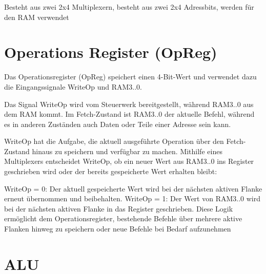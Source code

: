 Besteht aus zwei 2x4 Multiplexern, besteht aus zwei 2x4 Adressbits, werden für den RAM verwendet

\section{Operations Register (OpReg)}
\label{sec: operations-register}

Das Operationsregister (OpReg) speichert einen 4-Bit-Wert und verwendet dazu die Eingangssignale WriteOp und RAM3..0.

Das Signal WriteOp wird vom Steuerwerk bereitgestellt, während RAM3..0 aus dem RAM kommt. Im Fetch-Zustand ist RAM3..0 der aktuelle Befehl, während es in anderen Zuständen auch Daten oder Teile einer Adresse sein kann.

WriteOp hat die Aufgabe, die aktuell ausgeführte Operation über den Fetch-Zustand hinaus zu speichern und verfügbar zu machen. Mithilfe eines Multiplexers entscheidet WriteOp, ob ein neuer Wert aus RAM3..0 ins Register geschrieben wird oder der bereits gespeicherte Wert erhalten bleibt:

WriteOp = 0: Der aktuell gespeicherte Wert wird bei der nächsten aktiven Flanke erneut übernommen und beibehalten.
WriteOp = 1: Der Wert von RAM3..0 wird bei der nächsten aktiven Flanke in das Register geschrieben.
Diese Logik ermöglicht dem Operationsregister, bestehende Befehle über mehrere aktive Flanken hinweg zu speichern oder neue Befehle bei Bedarf aufzunehmen

















\section{ALU}

